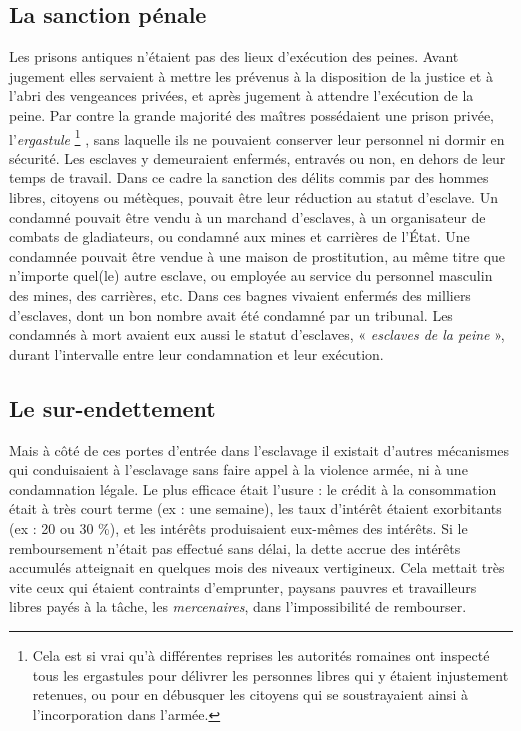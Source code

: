 \subsection{La sanction pénale}

Les prisons antiques n'étaient pas des lieux d'exécution des peines.
Avant jugement elles servaient à mettre les prévenus à la disposition de la
justice et à l'abri des vengeances privées, et après jugement à attendre
l'exécution de la peine. Par contre la grande majorité des maîtres possédaient
une prison privée, l'\emph{ergastule}%
\footnote{Cela est si vrai qu'à différentes reprises les autorités romaines ont inspecté tous les ergastules pour délivrer les
personnes libres qui y étaient injustement retenues, ou pour en débusquer les citoyens qui se soustrayaient ainsi à
l'incorporation dans l'armée.}%
, sans laquelle ils ne pouvaient
conserver leur personnel ni dormir en sécurité. Les esclaves y demeuraient
enfermés, entravés ou non, en dehors de leur temps de travail.
Dans ce cadre la sanction des délits commis par des hommes libres, citoyens
ou métèques, pouvait être leur réduction au statut d'esclave. Un
condamné pouvait être vendu à un marchand d'esclaves, à un organisateur
de combats de gladiateurs, ou condamné aux mines et carrières de
l'État. Une condamnée pouvait être vendue à une maison de prostitution,
au même titre que n'importe quel(le) autre esclave, ou employée au
service du personnel masculin des mines, des carrières, etc. Dans ces bagnes
vivaient enfermés des milliers d'esclaves, dont un bon nombre avait
été condamné par un tribunal. Les condamnés à mort avaient eux aussi le
statut d'esclaves, « \emph{esclaves de la peine} », durant l'intervalle entre leur
condamnation et leur exécution.

\subsection{Le sur-endettement}

Mais à côté de ces portes d'entrée dans l'esclavage il existait
d'autres mécanismes qui conduisaient à l'esclavage sans faire appel à la
violence armée, ni à une condamnation légale. Le plus efficace était
l'usure : le crédit à la consommation était à très court terme (ex : une semaine),
les taux d'intérêt étaient exorbitants (ex : 20 ou 30 \%), et les intérêts
produisaient eux-mêmes des intérêts. Si le remboursement n'était pas
effectué sans délai, la dette accrue des intérêts accumulés atteignait en
quelques mois des niveaux vertigineux. Cela mettait très vite ceux qui
étaient contraints d'emprunter, paysans pauvres et travailleurs libres
payés à la tâche, les \emph{mercenaires}, dans l'impossibilité de rembourser.

